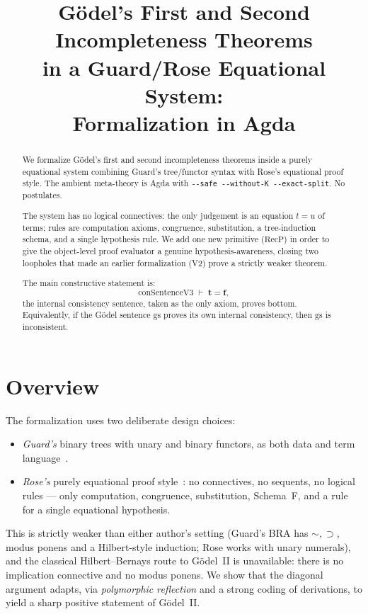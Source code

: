 \documentclass[11pt]{article}
\title{G\"odel's First and Second Incompleteness Theorems\\
in a Guard/Rose Equational System:\\
Formalization in Agda}
\author{}
\date{}
\newcommand{\trueT}{\mathbf{t}}
\newcommand{\falseT}{\mathbf{f}}
\newcommand{\RecP}{\mathrm{RecP}}
\begin{document}
\maketitle

\begin{abstract}
We formalize G\"odel's first and second incompleteness theorems
inside a purely equational system combining Guard's tree/functor
syntax with Rose's equational proof style.  The ambient meta-theory
is Agda with \verb|--safe --without-K --exact-split|.  No postulates.

The system has no logical connectives: the only judgement is an
equation $t = u$ of terms; rules are computation axioms, congruence,
substitution, a tree-induction schema, and a single hypothesis
rule.  We add one new primitive ($\RecP$) in order to give the
object-level proof evaluator a genuine hypothesis-awareness, closing
two loopholes that made an earlier formalization (V2) prove a
strictly weaker theorem.

The main constructive statement is:
\[
  \mathrm{conSentenceV3} \;\vdash\; \trueT = \falseT,
\]
the internal consistency sentence, taken as the only axiom, proves
bottom.  Equivalently, if the G\"odel sentence $\mathrm{gs}$ proves
its own internal consistency, then $\mathrm{gs}$ is inconsistent.
\end{abstract}

\tableofcontents

\section{Overview}

The formalization uses two deliberate design choices:

\begin{itemize}
\item \emph{Guard's} binary trees with unary and binary functors, as
  both data and term language~\cite{guard1963}.
\item \emph{Rose's} purely equational proof style~\cite{rose1961}:
  no connectives, no sequents, no logical rules --- only
  computation, congruence, substitution, Schema~F, and
  a rule for a single equational hypothesis.
\end{itemize}

This is strictly weaker than either author's setting (Guard's BRA
has $\sim, \supset$, modus ponens and a Hilbert-style induction;
Rose works with unary numerals), and the classical Hilbert--Bernays
route to G\"odel~II is unavailable: there is no implication
connective and no modus ponens.  We show that the diagonal argument
adapts, via \emph{polymorphic reflection} and a strong
coding of derivations, to yield a sharp positive statement of
G\"odel~II.
\end{document}
